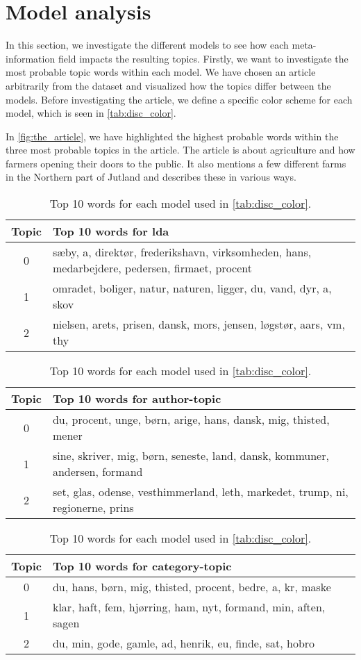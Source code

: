 \section{Model analysis}\label{sec:discussion}
In this section, we investigate the different models to see how each meta-information field impacts the resulting topics.
Firstly, we want to investigate the most probable topic words within each model.
We have chosen an article arbitrarily from the dataset and visualized how the topics differ between the models. 
Before investigating the article, we define a specific color scheme for each model, which is seen in \autoref{tab:disc_color}.

In \autoref{fig:the_article}, we have highlighted the highest probable words within the three most probable topics in the article.
The article is about agriculture and how farmers opening their doors to the public. 
It also mentions a few different farms in the Northern part of Jutland and describes these in various ways.

\begin{table}
	\caption{Top 10 words for each model used in \autoref{tab:disc_color}.}
	\label{tab:top_words_three_models}
	\begin{tabular}{c|p{}}
		Topic & Top 10 words for \gls{lda} \\
		\midrule
		0 & sæby, a, direktør, frederikshavn, virksomheden, hans, medarbejdere, pedersen, firmaet, procent \\
		1 & omradet, boliger, natur, naturen, ligger, du, vand, dyr, a, skov \\
		2 & nielsen, arets, prisen, dansk, mors, jensen, løgstør, aars, vm, thy \\
	\end{tabular}
	\begin{tabular}{c|p{}}
		\midrule
		Topic & Top 10 words for author-topic \\
		\midrule
		0 & du, procent, unge, børn, arige, hans, dansk, mig, thisted, mener\\
		1 & sine, skriver, mig, børn, seneste, land, dansk, kommuner, andersen, formand \\
		2 & set, glas, odense, vesthimmerland, leth, markedet, trump, ni, regionerne, prins\\
	\end{tabular}
	\begin{tabular}{c|p{}}
		\midrule
		Topic & Top 10 words for category-topic \\
		\midrule
		0 & du, hans, børn, mig, thisted, procent, bedre, a, kr, maske \\
		1 & klar, haft, fem, hjørring, ham, nyt, formand, min, aften, sagen\\
		2 & du, min, gode, gamle, ad, henrik, eu, finde, sat, hobro\\
	\end{tabular}
\end{table}

